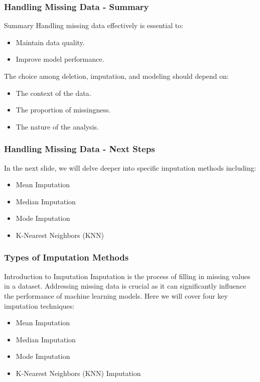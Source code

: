 \documentclass[aspectratio=169]{beamer}
\begin{document}
\begin{frame}[fragile]
    \frametitle{Handling Missing Data - Summary}
    \begin{block}{Summary}
        Handling missing data effectively is essential to:
        \begin{itemize}
            \item Maintain data quality.
            \item Improve model performance.
        \end{itemize}
        The choice among deletion, imputation, and modeling should depend on:
        \begin{itemize}
            \item The context of the data.
            \item The proportion of missingness.
            \item The nature of the analysis.
        \end{itemize}
    \end{block}
\end{frame}

\begin{frame}[fragile]
    \frametitle{Handling Missing Data - Next Steps}
    In the next slide, we will delve deeper into specific imputation methods including:
    \begin{itemize}
        \item Mean Imputation
        \item Median Imputation
        \item Mode Imputation
        \item K-Nearest Neighbors (KNN)
    \end{itemize}
\end{frame}

\begin{frame}[fragile]
    \frametitle{Types of Imputation Methods}
    \begin{block}{Introduction to Imputation}
        Imputation is the process of filling in missing values in a dataset. Addressing missing data is crucial as it can significantly influence the performance of machine learning models. Here we will cover four key imputation techniques:
    \end{block}
    \begin{itemize}
        \item Mean Imputation
        \item Median Imputation
        \item Mode Imputation
        \item K-Nearest Neighbors (KNN) Imputation
    \end{itemize}
\end{frame}
\end{document}
